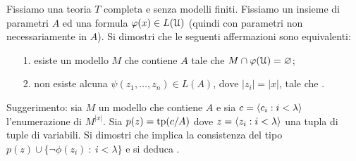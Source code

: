 \begin{exercise}
Fissiamo una teoria $T$ completa e senza modelli finiti. Fissiamo un insieme di parametri $A$ ed una formula $\varphi(x)\in L(\EuScript U)$ (quindi con parametri non necessariamente in $A$). Si dimostri che le seguenti affermazioni sono equivalenti:
\begin{itemize}
\item[1.] esiste un modello $M$ che contiene $A$ tale che $M\cap\varphi(\EuScript U)=\varnothing$;
\item[2.] non esiste alcuna $\psi(z_1,\dots,z_n)\in L(A)$, dove $|z_i|=|x|$, tale che .
\end{itemize}
Suggerimento: sia $M$ un modello che contiene $A$ e sia $c=\langle c_i:i<\lambda\rangle$ l'enumerazione di $M^{|x|}$. Sia $p(z)=\textrm{tp}(c/A)$ dove  $z=\langle z_i:i<\lambda\rangle$ una tupla di tuple di variabili. Si dimostri che  implica la consistenza del tipo $p(z)\cup \{\neg\phi(z_i)\ :\ i<\lambda\}$ e si deduca .\QED 
\end{exercise}


